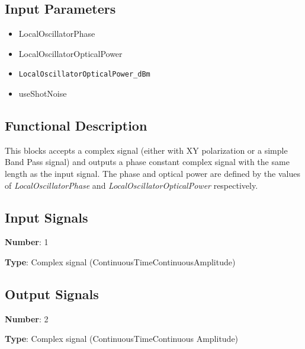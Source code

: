 \documentclass[../../sdf/tex/BPSK_system.tex]{subfiles}
\date{}
\begin{document}
\onlyinsubfile{\maketitle}

\subsection*{Input Parameters}

\begin{multicols}{2}
	\begin{itemize}
		\item LocalOscillatorPhase
		\item LocalOscillatorOpticalPower
		\item \verb|LocalOscillatorOpticalPower_dBm|
		\item useShotNoise
	\end{itemize}
\end{multicols}

\subsection*{Functional Description}

This blocks accepts a complex signal (either with XY polarization or a simple Band Pass signal) and outputs a phase constant complex signal with the same length as the input signal. The phase and optical power are defined by the values of \textit{LocalOscillatorPhase} and \textit{LocalOscillatorOpticalPower} respectively.
\subsection*{Input Signals}

\textbf{Number}: 1

\textbf{Type}: Complex signal (ContinuousTimeContinuousAmplitude)

\subsection*{Output Signals}

\textbf{Number}: 2

\textbf{Type}: Complex signal (ContinuousTimeContinuous Amplitude)
\end{document}
